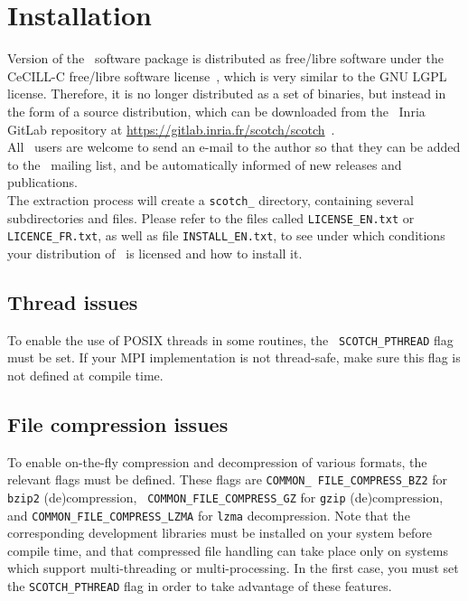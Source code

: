 
\section{Installation}
\label{sec-install}

Version {\sc \scotchver} of the \scotch\ software package is
distributed as free/libre software under the CeCILL-C free/libre
software license~\cite{cecill}, which is very similar to the GNU LGPL
license. Therefore, it is no longer distributed as a set of binaries,
but instead in the form of a source distribution, which can be
downloaded from the \scotch\ Inria GitLab repository at
\url{https://gitlab.inria.fr/scotch/scotch}~.
\\

All \scotch\ users are welcome to send an e-mail to the author so that
they can be added to the \scotch\ mailing list, and be automatically
informed of new releases and publications.
\\

The extraction process will create a {\tt scotch\_\scotchversub}
directory, containing several subdirectories and files. Please refer
to the files called {\tt LICENSE\_\lbt EN.txt} or
{\tt LICENCE\_\lbt FR.txt}, as well as file
{\tt INSTALL\_\lbt EN.txt}, to see under which conditions your
distribution of \scotch\ is licensed and how to install it.

\subsection{Thread issues}

To enable the use of POSIX threads in some routines, the {\tt
SCOTCH\_\lbt PTHREAD} flag must be set. If your MPI implementation is
not thread-safe, make sure this flag is not defined at compile time.

\subsection{File compression issues}

To enable on-the-fly compression and decompression of various formats,
the relevant flags must be defined. These flags are {\tt COMMON\_\lbt
FILE\_\lbt COMPRESS\_\lbt BZ2} for {\tt bzip2} (de)compression, {\tt
COMMON\_\lbt FILE\_\lbt COMPRESS\_\lbt GZ} for {\tt gzip}
(de)compression, and {\tt COMMON\_\lbt FILE\_\lbt COMPRESS\_\lbt LZMA}
for {\tt lzma} decompression. Note that the corresponding
development libraries must be installed on your system before compile
time, and that compressed file handling can take place only on systems
which support multi-threading or multi-processing. In the first case,
you must set the {\tt SCOTCH\_\lbt PTHREAD} flag in order to take
advantage of these features.

